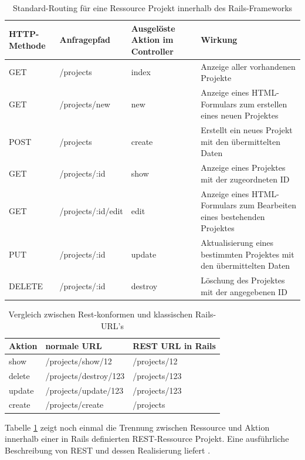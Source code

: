 \begin{table}[!h]
\caption{Standard-Routing für eine Ressource Projekt innerhalb des Rails-Frameworks}
\center
\begin{tabular}[!ht]{|p{2cm}|p{3cm}|p{3cm}|p{6cm}|}
\hline
HTTP-Methode & Anfragepfad & Ausgelöste Aktion im Controller & Wirkung\\
\hline
GET	& /projects & index & Anzeige aller vorhandenen Projekte\\
\hline
GET	& /projects/new	& new &	Anzeige eines HTML-Formulars zum erstellen eines neuen Projektes\\
\hline
POST & /projects & create & Erstellt ein neues Projekt mit den übermittelten Daten\\
\hline
GET & /projects/:id &	show &	Anzeige eines Projektes mit der zugeordneten ID\\
\hline
GET	& /projects/:id/edit & edit & Anzeige eines HTML-Formulars zum Bearbeiten eines bestehenden Projektes\\
\hline
PUT	& /projects/:id &	update & Aktualisierung eines bestimmten Projektes mit den übermittelten Daten\\
\hline
DELETE & /projects/:id &	destroy &	Löschung des Projektes mit der angegebenen ID\\
\hline
\end{tabular}
\end{table}

\begin{table}[!ht]
\caption{Vergleich zwischen Rest-konformen und klassischen Rails-URL's}
\label{tab.restnonrest}
\center
\begin{tabular}[!ht]{|l|l|l|}
\hline
Aktion & normale URL & 	REST URL in Rails \\
\hline
show &	/projects/show/12 &	/projects/12 \\
\hline
delete & /projects/destroy/123 & /projects/123 \\
\hline
update & /projects/update/123 &	/projects/123 \\
\hline
create & /projects/create & /projects \\
\hline
\end{tabular}
\end{table}

Tabelle \ref{tab.restnonrest} zeigt noch einmal die Trennung zwischen Ressource und Aktion innerhalb einer in Rails definierten REST-Ressource Projekt. Eine ausführliche Beschreibung von REST und dessen Realisierung liefert \cite{restful}.

\newpage
